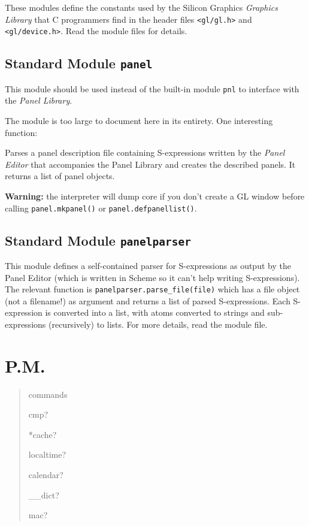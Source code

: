 These modules define the constants used by the Silicon Graphics
{\em Graphics Library}
that C programmers find in the header files
{\tt <gl/gl.h>}
and
{\tt <gl/device.h>}.
Read the module files for details.

\subsection{Standard Module {\tt panel}}

This module should be used instead of the built-in module
{\tt pnl}
to interface with the
{\em Panel Library}.

The module is too large to document here in its entirety.
One interesting function:
\begin{description}
Parses a panel description file containing S-expressions written by the
{\em Panel Editor}
that accompanies the Panel Library and creates the described panels.
It returns a list of panel objects.
\end{description}

{\bf Warning:}
the {\Python} interpreter will dump core if you don't create a GL window
before calling
{\tt panel.mkpanel()}
or
{\tt panel.defpanellist()}.

\subsection{Standard Module {\tt panelparser}}

This module defines a self-contained parser for S-expressions as output
by the Panel Editor (which is written in Scheme so it can't help writing
S-expressions).
The relevant function is
{\tt panelparser.parse\_file(file)}
which has a file object (not a filename!) as argument and returns a list
of parsed S-expressions.
Each S-expression is converted into a {\Python} list, with atoms converted
to {\Python} strings and sub-expressions (recursively) to {\Python} lists.
For more details, read the module file.

\section{P.M.}

\begin{verse}

commands

cmp?

*cache?

localtime?

calendar?

\_\_dict?

mac?

\end{verse}


